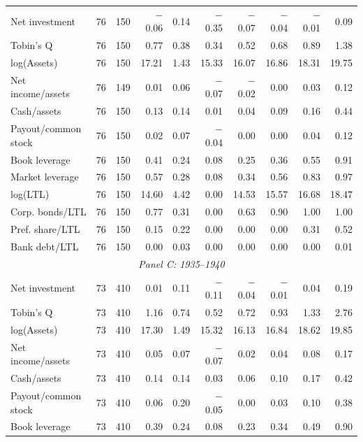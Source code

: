 \begin{table}[p]
\begin{threeparttable}
\begin{tabular}{lrrrrrrrrr}
            \midrule
            Net investment & 76 & 150 & $-$0.06 & 0.14 & $-$0.35 & $-$0.07 & $-$0.04 & $-$0.01 & 0.09 \\
            Tobin's Q & 76 & 150 & 0.77 & 0.38 & 0.34 & 0.52 & 0.68 & 0.89 & 1.38 \\
            log(Assets) & 76 & 150 & 17.21 & 1.43 & 15.33 & 16.07 & 16.86 & 18.31 & 19.75 \\
            Net income/assets & 76 & 149 & 0.01 & 0.06 & $-$0.07 & $-$0.02 & 0.00 & 0.03 & 0.12 \\
            Cash/assets & 76 & 150 & 0.13 & 0.14 & 0.01 & 0.04 & 0.09 & 0.16 & 0.44 \\
            Payout/common stock & 76 & 150 & 0.02 & 0.07 & $-$0.04 & 0.00 & 0.00 & 0.04 & 0.12 \\
            Book leverage & 76 & 150 & 0.41 & 0.24 & 0.08 & 0.25 & 0.36 & 0.55 & 0.91 \\
            Market leverage & 76 & 150 & 0.57 & 0.28 & 0.08 & 0.34 & 0.56 & 0.83 & 0.97 \\
            log(LTL) & 76 & 150 & 14.60 & 4.42 & 0.00 & 14.53 & 15.57 & 16.68 & 18.47 \\
            Corp. bonds/LTL & 76 & 150 & 0.77 & 0.31 & 0.00 & 0.63 & 0.90 & 1.00 & 1.00 \\
            Pref. share/LTL & 76 & 150 & 0.15 & 0.22 & 0.00 & 0.00 & 0.00 & 0.31 & 0.52 \\
            Bank debt/LTL & 76 & 150 & 0.00 & 0.03 & 0.00 & 0.00 & 0.00 & 0.00 & 0.01 \\
            \midrule
            \multicolumn{10}{c}{\textit{Panel C: 1935--1940}} \\
            \midrule
            Net investment & 73 & 410 & 0.01 & 0.11 & $-$0.11 & $-$0.04 & $-$0.01 & 0.04 & 0.19 \\
            Tobin's Q & 73 & 410 & 1.16 & 0.74 & 0.52 & 0.72 & 0.93 & 1.33 & 2.76 \\
            log(Assets) & 73 & 410 & 17.30 & 1.49 & 15.32 & 16.13 & 16.84 & 18.62 & 19.85 \\
            Net income/assets & 73 & 410 & 0.05 & 0.07 & $-$0.07 & 0.02 & 0.04 & 0.08 & 0.17 \\
            Cash/assets & 73 & 410 & 0.14 & 0.14 & 0.03 & 0.06 & 0.10 & 0.17 & 0.42 \\
            Payout/common stock & 73 & 410 & 0.06 & 0.20 & $-$0.05 & 0.00 & 0.03 & 0.10 & 0.38 \\
            Book leverage & 73 & 410 & 0.39 & 0.24 & 0.08 & 0.23 & 0.34 & 0.49 & 0.90 \\

\end{tabular}
\end{threeparttable}
\end{table}
